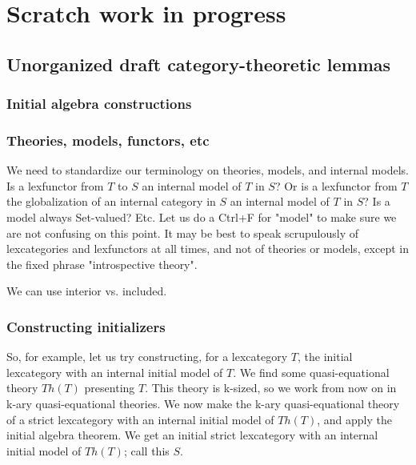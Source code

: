 \filestart

\section{Scratch work in progress}

\subsection{Unorganized draft category-theoretic lemmas}

\subsubsection{Initial algebra constructions}
\TODO

\subsubsection{Theories, models, functors, etc}
\begin{observation}\label{ModelTerminology}
We need to standardize our terminology on theories, models, and internal models. Is a lexfunctor from $T$ to $S$ an internal model of $T$ in $S$? Or is a lexfunctor from $T$ the globalization of an internal category in $S$ an internal model of $T$ in $S$? Is a model always Set-valued? Etc. Let us do a Ctrl+F for "model" to make sure we are not confusing on this point. It may be best to speak scrupulously of lexcategories and lexfunctors at all times, and not of theories or models, except in the fixed phrase "introspective theory".

We can use interior vs. included.
\end{observation}


\subsubsection{Constructing initializers}
So, for example, let us try constructing, for a lexcategory $T$, the initial lexcategory with an internal initial model of $T$. We find some quasi-equational theory $Th(T)$ presenting $T$. This theory is k-sized, so we work from now on in k-ary quasi-equational theories. We now make the k-ary quasi-equational theory of a strict lexcategory with an internal initial model of $Th(T)$, and apply the initial algebra theorem. We get an initial strict lexcategory with an internal initial model of $Th(T)$; call this $S$.

